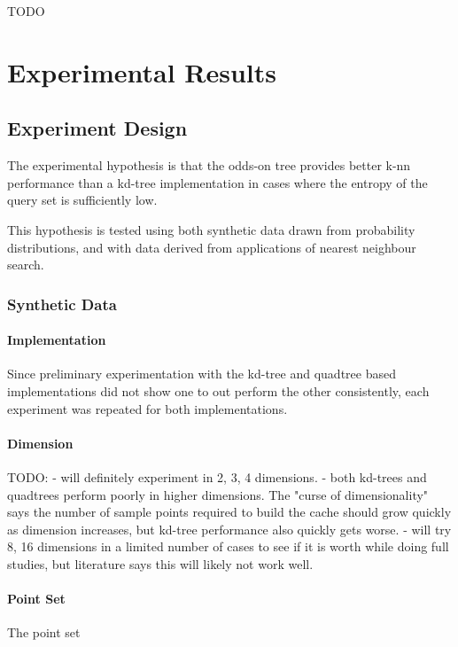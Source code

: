 \documentclass[mcs]{scsthesis}
\begin{document}
TODO

\chapter{Experimental Results}

\section{Experiment Design}

The experimental hypothesis is that the odds-on tree provides better k-nn
performance than a kd-tree implementation in cases where the entropy of the
query set is sufficiently low.

This hypothesis is tested using both synthetic data drawn from probability
distributions, and with data derived from applications of nearest neighbour
search. 

\subsection{Synthetic Data}

\subsubsection{Implementation}

Since preliminary experimentation with the kd-tree and quadtree based
implementations did not show one to out perform the other consistently, each
experiment was repeated for both implementations.

\subsubsection{Dimension}

TODO:
- will definitely experiment in 2, 3, 4 dimensions.
- both kd-trees and quadtrees perform poorly in higher dimensions.  The "curse
of dimensionality" says the number of sample points required to build the cache
should grow quickly as dimension increases, but kd-tree performance also quickly
gets worse.
- will try 8, 16 dimensions in a limited number of cases to see if it is worth
while doing full studies, but literature says this will likely not work well.

\subsubsection{Point Set}

The point set
\end{document}
